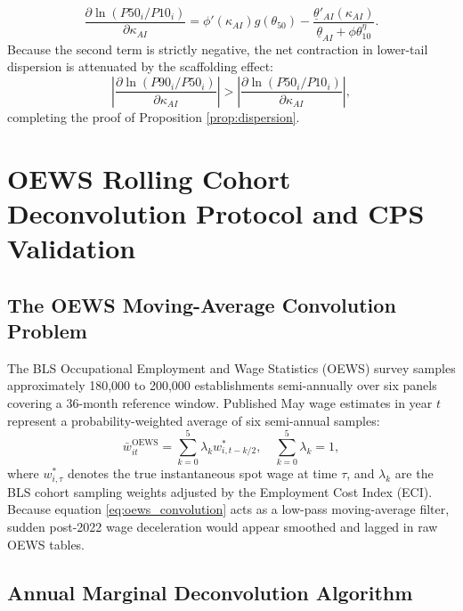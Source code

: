 \documentclass[12pt]{article}
\begin{document}
\begin{equation}
\frac{\partial \ln (P50_i / P10_i)}{\partial \kappa_{AI}} = \phi'(\kappa_{AI}) g(\theta_{50}) - \frac{\underline{\theta}'_{AI}(\kappa_{AI})}{\underline{\theta}_{AI} + \phi \theta_{10}^\eta}.
\end{equation}
Because the second term is strictly negative, the net contraction in lower-tail dispersion is attenuated by the scaffolding effect:
\begin{equation}
\left| \frac{\partial \ln (P90_i / P50_i)}{\partial \kappa_{AI}} \right| > \left| \frac{\partial \ln (P50_i / P10_i)}{\partial \kappa_{AI}} \right|,
\end{equation}
completing the proof of Proposition \ref{prop:dispersion}.

\newpage
\section{OEWS Rolling Cohort Deconvolution Protocol and CPS Validation}
\label{app:deconvolution}

\subsection{The OEWS Moving-Average Convolution Problem}

The BLS Occupational Employment and Wage Statistics (OEWS) survey samples approximately 180,000 to 200,000 establishments semi-annually over six panels covering a 36-month reference window. Published May wage estimates in year $t$ represent a probability-weighted average of six semi-annual samples:
\begin{equation}
\label{eq:oews_convolution}
\bar{w}_{it}^{\text{OEWS}} = \sum_{k=0}^5 \lambda_k w_{i, t - k/2}^*, \quad \sum_{k=0}^5 \lambda_k = 1,
\end{equation}
where $w_{i, \tau}^*$ denotes the true instantaneous spot wage at time $\tau$, and $\lambda_k$ are the BLS cohort sampling weights adjusted by the Employment Cost Index (ECI). Because equation \eqref{eq:oews_convolution} acts as a low-pass moving-average filter, sudden post-2022 wage deceleration would appear smoothed and lagged in raw OEWS tables.

\subsection{Annual Marginal Deconvolution Algorithm}
\end{document}
